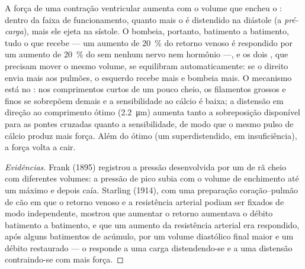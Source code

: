 \begin{theorem}\label{thm:b2:heart:starling}
A força de uma contração ventricular aumenta com o volume que encheu o
: dentro da faixa de funcionamento, quanto mais o  é
distendido na diástole (a \emph{pré-carga}), mais ele ejeta na sístole.
O  bombeia, portanto, batimento a batimento, tudo o que recebe
--- um aumento de \qty{20}{\%} do retorno venoso é respondido por um
aumento de \qty{20}{\%} do  sem nenhum nervo nem
hormônio ---, e os dois , que precisam mover o mesmo volume,
se equilibram automaticamente: se o  direito envia mais 
aos pulmões, o  esquerdo recebe mais e bombeia mais. O mecanismo
está no : nos comprimentos curtos de um  pouco cheio,
os filamentos grossos e finos se sobrepõem demais e a sensibilidade ao
cálcio é baixa; a distensão em direção ao comprimento ótimo
(\qty{2.2}{\micro m}) aumenta tanto a sobreposição disponível para as
pontes cruzadas quanto a sensibilidade, de modo que o mesmo pulso de
cálcio produz mais força. Além do ótimo (um  superdistendido,
em insuficiência), a força volta a cair.
\end{theorem}
\begin{proof}[Evidências]
Frank (1895) registrou a pressão desenvolvida por um  de rã
cheio com diferentes volumes: a pressão de pico subia com o volume de
enchimento até um máximo e depois caía. Starling (1914), com uma
preparação coração--pulmão de cão em que o retorno venoso e a
resistência arterial podiam ser fixados de modo independente, mostrou
que aumentar o retorno aumentava o débito batimento a batimento, e que
um aumento da resistência arterial era respondido, após alguns
batimentos de acúmulo, por um volume diastólico final maior e um débito
restaurado --- o  responde a uma carga distendendo-se e a uma
distensão contraindo-se com mais força.
\end{proof}

